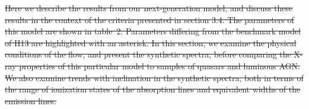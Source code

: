 \documentclass[preprint, a4paper, 11pt]{aastex}
\providecommand{\DIFdel}[1]{{\protect\color{red}\sout{#1}}}                      %
\begin{document}

\DIFdel{Here we describe the results from our next-generation model,
and discuss these results in the context of the criteria 
presented in section 3.4. The parameters of this model are shown in table~2.
Parameters differing from the benchmark model of H13 are 
highlighted with an asterisk. In this section, we examine the physical 
conditions of the flow, and present the synthetic spectra, before comparing
the X-ray properties of this particular model to samples of
quasars and luminous AGN. We also examine trends with inclination in the synthetic spectra, 
both in terms of the range of ionization states of the absorption lines and equivalent widths 
of the emission lines.
}%

\end{document}

